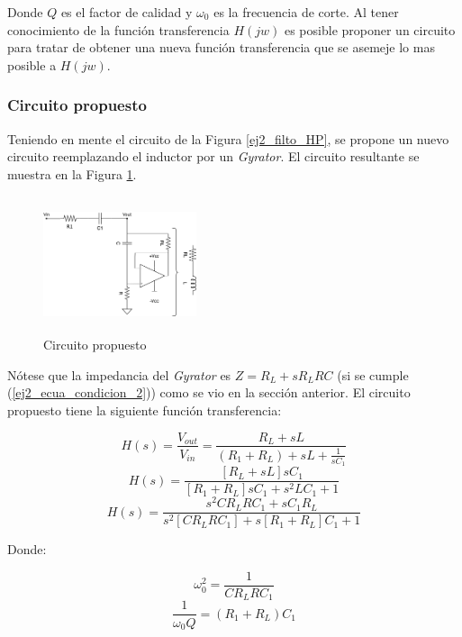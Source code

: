 Donde $Q$ es el factor de calidad y $\omega_0$ es la frecuencia de corte.      
Al tener conocimiento de la función transferencia $H(jw)$ es posible proponer un circuito para tratar de obtener una nueva función transferencia que se asemeje lo mas posible a $H(jw)$. 

\subsubsection{Circuito propuesto}
Teniendo en mente el circuito de la Figura \ref{ej2_filto_HP}, se propone un nuevo circuito reemplazando el inductor por un \textit{Gyrator}. El circuito resultante se muestra en la Figura \ref{fig:ej2_HP_propuesto}. 

\begin{figure}[!]                                                       
    \centering\includegraphics[width=0.4\textwidth, height=4cm]{../Ex2/Resources/ej2_hp_gyrator.png}
    \caption{Circuito propuesto}
    \label{fig:ej2_HP_propuesto}
    \end{figure}

Nótese que la impedancia del \textit{Gyrator} es $Z = R_L + sR_L R C$ (si se cumple (\ref{ej2_ecua_condicion_2})) como se vio en la sección anterior. El circuito propuesto tiene la siguiente función transferencia:

\begin{displaymath} H(s)= \frac{V_{out}}{V_{in}} = \frac{R_L + sL}{(R_1 + R_L) +sL + \frac{1}{sC_1}} \end{displaymath}  
\begin{displaymath} H(s)= \frac{[R_L + sL]sC_1}{[R_1 + R_L]sC_1 +s^2LC_1 + 1} \end{displaymath}
\begin{displaymath} H(s)= \frac{s^2CR_LRC_1 + sC_1R_L}{s^2[CR_LRC_1] + s[R_1 + R_L]C_1 + 1} \end{displaymath}

Donde:

\begin{displaymath} \omega_0^2= \frac{1}{CR_LRC_1} \end{displaymath}  
\begin{displaymath} \frac{1}{\omega_0 Q}= (R_1 + R_L) C_1 \end{displaymath}  


